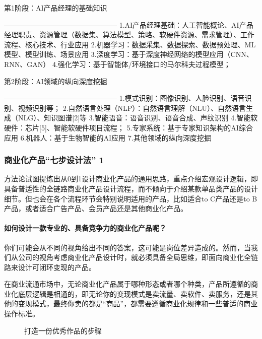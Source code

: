\documentclass[letterpaper,10pt,english]{sphinxmanual}
\begin{document}
第1阶段：AI产品经理的基础知识

————————————————
1.AI产品经理基础：人工智能概论、AI产品经理职责、资源管理（数据集、算法模型、策略、软硬件资源、需求管理）、工作流程、核心技术、行业应用
2.机器学习：数据采集、数据探索、数据预处理、ML模型、模型训练、场景应用
3.深度学习：基于深度神经网络的模型应用（CNN、RNN、GAN）
4.强化学习：基于智能体/环境接口的马尔科夫过程模型；

第2阶段：AI领域的纵向深度挖掘

———————————————— 1.模式识别：图像识别、人脸识别、语音识别、视频识别等；
2.自然语言处理（NLP）：自然语言理解（NLU）、自然语言生成（NLG）、知识图谱{[}2{]}等
3.智能语音：语音识别、语音合成、声纹识别
4.智能软硬件：芯片{[}5{]}、智能软硬件项目流程；
5.专家系统：基于专家知识架构的AI综合应用 6.机器人：基于生物智能的AI应用
7.其他领域的纵向深度挖掘


\subsubsection{商业化产品“七步设计法” 1\sphinxfootnotemark[476]}
\label{\detokenize{chapter_knowledge/steps:id1}}\label{\detokenize{chapter_knowledge/steps::doc}}%
\begin{footnotetext}[476]\sphinxAtStartFootnote
{}
%
\end{footnotetext}\ignorespaces 
方法论试图提炼出从0到1设计商业化产品的通用思路，重点介绍宏观设计逻辑，即具备普适性的全链路商业化产品设计流程，而不倾向于介绍某款单品类产品的设计细节。但也会在各个流程环节会特别说明适用的产品，比如适合to
C产品还是to B产品，或者适合广告产品、会员产品还是其他商业化产品。


\paragraph{如何设计一款专业的、具备竞争力的商业化产品呢？}
\label{\detokenize{chapter_knowledge/steps:id2}}
你们可能会从不同的视角给出不同的答案，这可能是岗位差异造成的。然而，当我们从公司的视角考虑商业化产品设计时，就必须具备全局思维，即面向商业化全链路来设计可闭环变现的产品。

在商业流通市场中，无论商业化产品属于哪种形态或者哪个种类，产品所遵循的商业化底层逻辑是相通的，即无论你的变现模式是卖流量、卖软件、卖服务，还是其他的变现模式，最终你卖的都是“商品”，都需要遵循商业化规律和一些普适的商业操作标准。

\begin{figure}[H]
\centering
\capstart

\noindent{}
\caption{打造一份优秀作品的步骤}\label{\detokenize{chapter_knowledge/steps:id5}}\end{figure}
\end{document}
